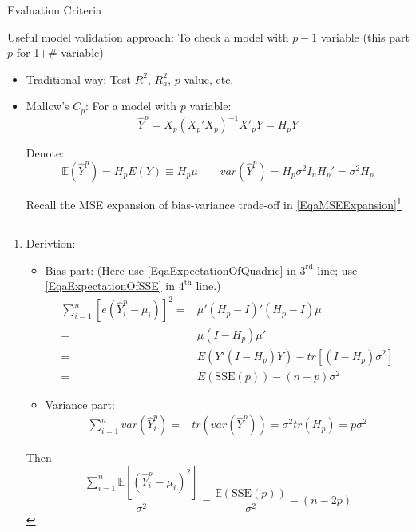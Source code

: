 \begin{point}
    \hypertarget{ModelValidationCriteria}{Evaluation Criteria}
\end{point}

     Useful model validation approach: To check a model with $ p-1 $ variable (this part $ p $ for 1+\# variable)
        \begin{itemize}[topsep=2pt,itemsep=2pt]
        \item Traditional way: Test $ R^2 $, $ R_a^2 $, $ p $-value, etc.
        \item Mallow's $ C_p $: For a model with $ p $ variable: 
        \begin{equation}
            \hat{Y}^p=X_p(X_p'X_p)^{-1}X'_pY=H_pY 
        \end{equation}
        
        Denote:
        \begin{equation}
            \mathbb{E}(\hat{Y}^p)=H_pE(Y)\equiv H_p\mu \qquad var(\hat{Y}^p)=H_p\sigma ^2I_nH_p'=\sigma ^2H_p
        \end{equation}

        Recall the MSE expansion of bias-variance trade-off in \autoref{EqaMSEExpansion}\footnote{Derivtion:
        \begin{itemize}[topsep=2pt,itemsep=0pt]
            \item Bias part: (Here use \autoref{EqaExpectationOfQuadric} in $ 3^\mathrm{rd} $ line; use \autoref{EqaExpectationOfSSE} in $ 4^\mathrm{th} $ line.)
            \begin{align*}
                \sum_{i=1}^n[e(\hat{Y}_i^p-\mu _i)]^2=&\mu'(H_p-I)'(H_p-I)\mu\\
                =&\mu (I-H_p)\mu '\\
                =&E(Y'(I-H_p)Y)-tr[(I-H_p)\sigma ^2]\\
                =&E(\mathrm{SSE}(p))-(n-p)\sigma ^2
            \end{align*}
            \item Variance part:
            \begin{align*}
                \sum_{i=1}^nvar(\hat{Y}_i^p)=& tr(var(\hat{Y}^p))=\sigma ^2tr(H_p)=p\sigma ^2
            \end{align*}
        \end{itemize}

        Then
        \begin{equation}
             \dfrac{\sum_{i=1}^n \mathbb{E}[(\hat{Y}_i^p-\mu_i)^2]}{\sigma ^2}=\dfrac{\mathbb{E}(\mathrm{SSE}(p) )}{\sigma ^2}-(n-2p)
        \end{equation}
            }


\end{itemize}
